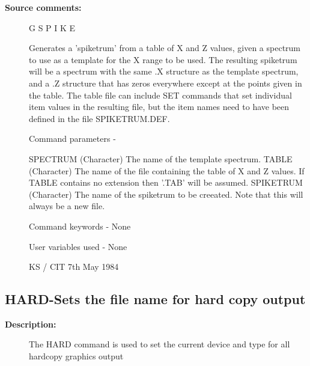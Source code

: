 \begin{description}
\begin{description}
\item [\textbf{Source comments:}]
\begin{terminalv}
 G S P I K E

 Generates a 'spiketrum' from a table of X and Z values, given a
 spectrum to use as a template for the X range to be used.  The
 resulting spiketrum will be a spectrum with the same .X structure
 as the template spectrum, and a .Z structure that has zeros
 everywhere except at the points given in the table.  The table file
 can include SET commands that set individual item values in the
 resulting file, but the item names need to have been defined in the
 file SPIKETRUM.DEF.

 Command parameters -

 SPECTRUM    (Character) The name of the template spectrum.
 TABLE       (Character) The name of the file containing the
             table of X and Z values.  If TABLE contains no
             extension then '.TAB' will be assumed.
 SPIKETRUM   (Character) The name of the spiketrum to be creeated.
             Note that this will always be a new file.

 Command keywords -  None

 User variables used - None

                                       KS / CIT 7th May 1984
\end{terminalv}
\end{description}
\subsection{HARD-\label{HARD}Sets the file name for hard copy output}
\begin{description}

\item [\textbf{Description:}]
 The HARD command is used to set the current device and type
 for all hardcopy graphics output


\end{description}
\end{description}
